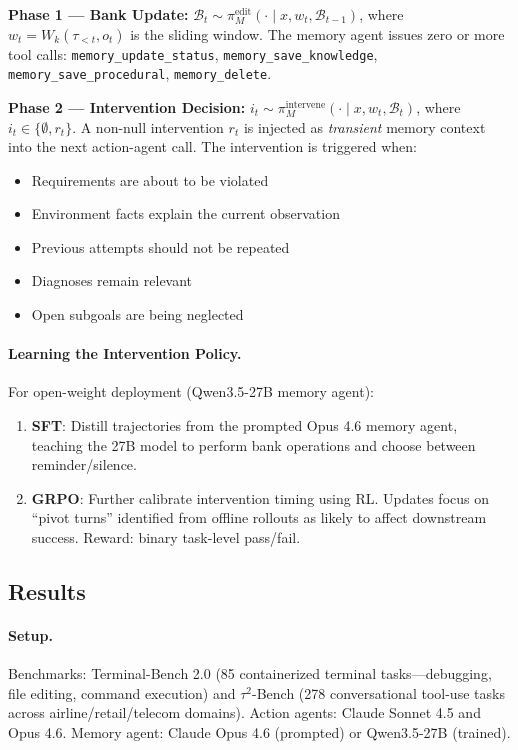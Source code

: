 \documentclass[11pt,a4paper]{article}
\begin{document}
\textbf{Phase 1 --- Bank Update:} $\mathcal{B}_t \sim \pi_M^{\mathrm{edit}}(\cdot \mid x, w_t, \mathcal{B}_{t-1})$, where $w_t = W_k(\tau_{<t}, o_t)$ is the sliding window. The memory agent issues zero or more tool calls: \texttt{memory\_update\_status}, \texttt{memory\_save\_knowledge}, \texttt{memory\_save\_procedural}, \texttt{memory\_delete}.

\textbf{Phase 2 --- Intervention Decision:} $i_t \sim \pi_M^{\mathrm{intervene}}(\cdot \mid x, w_t, \mathcal{B}_t)$, where $i_t \in \{\emptyset, r_t\}$. A non-null intervention $r_t$ is injected as \emph{transient} memory context into the next action-agent call. The intervention is triggered when:
\begin{itemize}
\item Requirements are about to be violated
\item Environment facts explain the current observation
\item Previous attempts should not be repeated
\item Diagnoses remain relevant
\item Open subgoals are being neglected
\end{itemize}

\paragraph{Learning the Intervention Policy.} For open-weight deployment (Qwen3.5-27B memory agent):
\begin{enumerate}
\item \textbf{SFT}: Distill trajectories from the prompted Opus 4.6 memory agent, teaching the 27B model to perform bank operations and choose between reminder/silence.
\item \textbf{GRPO}: Further calibrate intervention timing using RL. Updates focus on ``pivot turns'' identified from offline rollouts as likely to affect downstream success. Reward: binary task-level pass/fail.
\end{enumerate}

\subsection{Results}

\paragraph{Setup.} Benchmarks: Terminal-Bench 2.0 (85 containerized terminal tasks---debugging, file editing, command execution) and $\tau^2$-Bench (278 conversational tool-use tasks across airline/retail/telecom domains). Action agents: Claude Sonnet 4.5 and Opus 4.6. Memory agent: Claude Opus 4.6 (prompted) or Qwen3.5-27B (trained).
\end{document}
